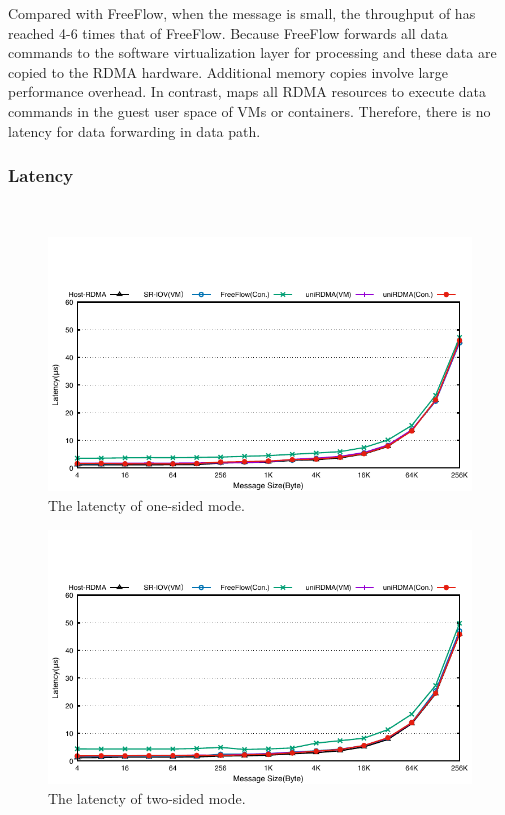 Compared with FreeFlow, when the message is small, the throughput of \sys has reached 4-6 times that of FreeFlow. Because FreeFlow forwards all data commands to the software virtualization layer for processing and these data are copied to the RDMA hardware. Additional memory copies involve large performance overhead. In contrast, \sys maps all RDMA resources to execute data commands in the guest user space of VMs or containers. Therefore, there is no latency for data forwarding in data path.





\subsubsection{\textbf{Latency}}
\
\noindent

\begin{figure}[!ht]
	\centering
	\includegraphics[width=0.8\linewidth]{images/write-lat.pdf}
	\caption{The latencty of one-sided mode.}
	\label{fig:write-lat}
\end{figure}


\begin{figure}[!ht]
	\centering
	\includegraphics[width=0.8\linewidth]{images/send-lat.pdf}
	\caption{The latencty of two-sided mode.}
	\label{fig:send-lat}
\end{figure}


